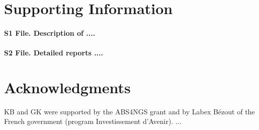 \documentclass[10pt,letterpaper]{article}
\begin{document}
% 

% 

% 

% 

\section*{Supporting Information}

\paragraph{
	S1 File. Description of ....
}

\paragraph{
	S2 File. Detailed reports ....
}


\section*{Acknowledgments}

KB and GK were supported by the ABS4NGS grant and by Labex B{\' e}zout of the French government (program Investissement d’Avenir). ...

\nolinenumbers

 
\end{document}

